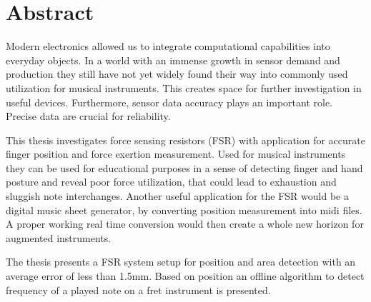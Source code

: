 \section*{Abstract}

Modern electronics allowed us to integrate computational capabilities into everyday objects. In a world with an immense growth in sensor demand and production they still have not yet widely found their way into commonly used utilization for musical instruments. This creates space for further investigation in useful devices. Furthermore, sensor data accuracy plays an important role. Precise data are crucial for reliability.

This thesis investigates force sensing resistors (FSR) with application for accurate finger position and force exertion measurement. Used for musical instruments they can be used for educational purposes in a sense of detecting finger and hand posture and reveal poor force utilization, that could lead to exhaustion and sluggish note interchanges. Another useful application for the FSR would be a digital music sheet generator, by converting position measurement into midi files. A proper working real time conversion would then create a whole new horizon for augmented instruments.

The thesis presents a FSR system setup for position and area detection with an average error of less than 1.5mm. Based on position an offline algorithm to detect frequency of a played note on a fret instrument is presented.